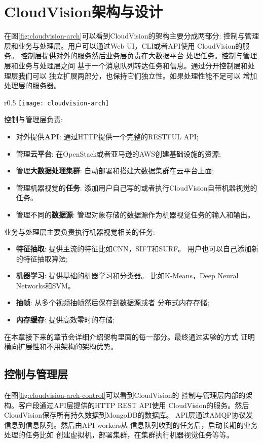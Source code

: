 \chapter{CloudVision架构与设计}
\label{cha:architecture}
在图\ref{fig:cloudvision-arch}可以看到CloudVision的架构主要分成两部分:
控制与管理层和业务与处理层。用户可以通过Web UI，CLI或者API使用
CloudVision的服务。 控制层提供对外的服务然后业务层负责在大数据平台
处理任务。控制与管理层和业务与处理层之间
基于一个消息队列转达任务和信息。通过分开控制层和处理层我们可以
独立扩展两部分，也保持它们独立性。如果处理性能不足可以
增加处理层的服务器。
\begin{wrapfigure}{r}{0.5\textwidth}
  \centering
  \texttt{[image: cloudvision-arch]}
  \caption{CloudVision 总体架构}
  \label{fig:cloudvision-arch}
\end{wrapfigure}
控制与管理层负责:
\begin{itemize}
  \item 对外提供\textbf{API}: 通过HTTP提供一个完整的RESTFUL API;
  \item 管理\textbf{云平台}: 在OpenStack或者亚马逊的AWS创建基础设施的资源;
  \item 管理\textbf{大数据处理集群}: 自动部署和搭建大数据集群在云平台上面;
  \item 管理机器视觉的\textbf{任务}: 添加用户自己写的或者执行CloudVision自带机器视觉的任务。
  \item 管理不同的\textbf{数据源}: 管理对象存储的数据源作为机器视觉任务的输入和输出。
\end{itemize}
业务与处理层主要负责执行机器视觉相关的任务:
\begin{itemize}
  \item \textbf{特征抽取}: 提供主流的特征比如CNN，SIFT和SURF。
        用户也可以自己添加新的特征抽取算法;
  \item \textbf{机器学习}: 提供基础的机器学习和分类器。
        比如K-Means，Deep Neural Networks和SVM。
  \item \textbf{抽帧}: 从多个视频抽帧然后保存到数据源或者
        分布式内存存储;
  \item \textbf{内存缓存}: 提供高效零时的存储;
\end{itemize}

在本章接下来的章节会详细介绍架构里面的每一部分。最终通过实验的方式
证明横向扩展性和不用架构的架构优势。


\section{控制与管理层}
\label{sec:arch_control}
在图\ref{fig:cloudvision-arch-control}可以看到CloudVision的
控制与管理层内部的架构。客户段通过API层提供的HTTP REST API使用
CloudVision的服务。然后CloudVision保存所有持久数据到MongoDB的数据库。
API层通过AMQP协议发信息到信息队列。然后由API workers从
信息队列收到的任务后，启动长期的业务处理的任务比如
创建虚拟机，部署集群，在集群执行机器视觉任务等等。

